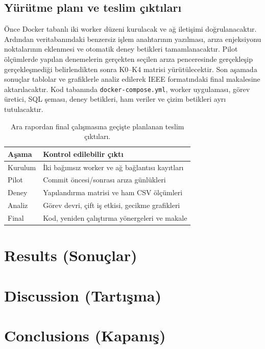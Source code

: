 \documentclass[conference,a4paper]{IEEEtran}
\newcommand{\code}[1]{\texttt{#1}}
\begin{document}
\subsection{Yürütme planı ve teslim çıktıları}
Önce Docker tabanlı iki worker düzeni kurulacak ve ağ iletişimi doğrulanacaktır. Ardından veritabanındaki benzersiz işlem anahtarının yazılması, arıza enjeksiyonu noktalarının eklenmesi ve otomatik deney betikleri tamamlanacaktır. Pilot ölçümlerde yapılan denemelerin gerçekten seçilen arıza penceresinde gerçekleşip gerçekleşmediği belirlendikten sonra K0--K4 matrisi yürütülecektir. Son aşamada sonuçlar tablolar ve grafiklerle analiz edilerek IEEE formatındaki final makalesine aktarılacaktır. Kod tabanında \code{docker-compose.yml}, worker uygulaması, görev üretici, SQL şeması, deney betikleri, ham veriler ve çizim betikleri ayrı tutulacaktır.

\begin{table}[t]
\caption{Ara rapordan final çalışmasına geçişte planlanan teslim çıktıları.}
\centering\footnotesize
\begin{tabularx}{\columnwidth}{@{}p{12mm}X@{}}
\toprule
Aşama & Kontrol edilebilir çıktı\\
\midrule
Kurulum & İki bağımsız worker ve ağ bağlantısı kayıtları\\
Pilot & Commit öncesi/sonrası arıza günlükleri\\
Deney & Yapılandırma matrisi ve ham CSV ölçümleri\\
Analiz & Görev devri, çift iş etkisi, gecikme grafikleri\\
Final & Kod, yeniden çalıştırma yönergeleri ve makale\\
\bottomrule
\end{tabularx}
\label{tab:outputs}
\end{table}

\section{Results (Sonuçlar)}
\section{Discussion (Tartışma)}
\section{Conclusions (Kapanış)}

\balance


\end{document}
